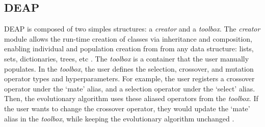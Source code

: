 \subsection{\acrlong{DEAP}}
\gls{DEAP} is composed of two simples structures: a \textit{creator} and a 
\textit{toolbox}.  
The \textit{creator} module allows the run-time creation of classes via 
inheritance and composition, enabling individual and population creation from 
from any data structure: lists, sets, dictionaries, trees, etc \cite{fortin_deap_2012}. 
The \textit{toolbox} is a container that the user manually populates.
In the \textit{toolbox}, the user defines the selection, crossover, and 
mutation operator types and hyperparameters. 
For example, the user registers a crossover operator under the `mate'
alias, and a selection operator under the `select' alias. 
Then, the evolutionary algorithm uses these aliased operators from the 
\textit{toolbox}. 
If the user wants to change the crossover operator, they would update the 
`mate' alias in the \textit{toolbox}, while keeping the evolutionary algorithm 
unchanged \cite{fortin_deap_2012}. 

